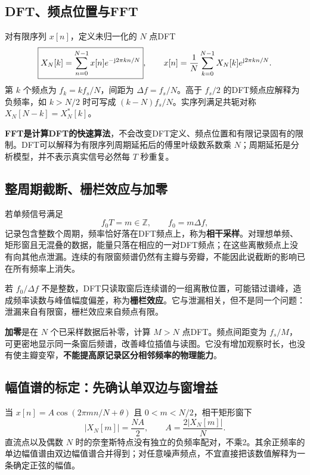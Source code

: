 \subsection{DFT、频点位置与FFT}
对有限序列 $x[n]$，定义未归一化的 $N$ 点DFT
\[
\boxed{X_N[k]=\sum_{n=0}^{N-1}x[n]e^{-\mathrm{j}2\pi kn/N}},\qquad
x[n]=\frac1N\sum_{k=0}^{N-1}X_N[k]e^{\mathrm{j}2\pi kn/N}.
\]
第 $k$ 个频点为 $f_k=kf_s/N$，间距为 $\Delta f=f_s/N$。高于 $f_s/2$ 的DFT频点应解释为负频率，如 $k>N/2$ 时可写成 $(k-N)f_s/N$。实序列满足共轭对称 $X_N[N-k]=X_N^*[k]$。

\textbf{FFT是计算DFT的快速算法}，不会改变DFT定义、频点位置和有限记录固有的限制。DFT可以解释为有限序列周期延拓后的傅里叶级数系数乘 $N$；周期延拓是分析模型，并不表示真实信号必然每 $T$ 秒重复。

\Needspace{5cm}
\subsection{整周期截断、栅栏效应与加零}
若单频信号满足
\[
\boxed{f_0T=m\in\mathbb Z},\qquad f_0=m\Delta f,
\]
记录包含整数个周期，频率恰好落在DFT频点上，称为\textbf{相干采样}。对理想单频、矩形窗且无混叠的数据，能量只落在相应的一对DFT频点；在这些离散频点上没有向其他点泄漏。连续的有限窗频谱仍然有主瓣与旁瓣，不能因此说截断的影响已在所有频率上消失。

若 $f_0/\Delta f$ 不是整数，DFT只读取窗后连续谱的一组离散位置，可能错过谱峰，造成频率读数与峰值幅度偏差，称为\textbf{栅栏效应}。它与泄漏相关，但不是同一个问题：泄漏来自有限窗，栅栏效应来自频点有限。

\textbf{加零}是在 $N$ 个已采样数据后补零，计算 $M>N$ 点DFT。频点间距变为 $f_s/M$，可更密地显示同一条窗后频谱，改善峰位插值与读图。它没有增加观察时长，也没有使主瓣变窄，\textbf{不能提高原记录区分相邻频率的物理能力}。


\subsection{幅值谱的标定：先确认单双边与窗增益}
当 $x[n]=A\cos(2\pi mn/N+\theta)$ 且 $0<m<N/2$，相干矩形窗下
\[
|X_N[m]|=\frac{NA}{2},\qquad
\boxed{A=\frac{2|X_N[m]|}{N}}.
\]
直流点以及偶数 $N$ 时的奈奎斯特点没有独立的负频率配对，不乘2。其余正频率的单边幅值谱由双边幅值谱合并得到；对任意噪声频点，不宜直接把该数值解释为一条确定正弦的幅值。

